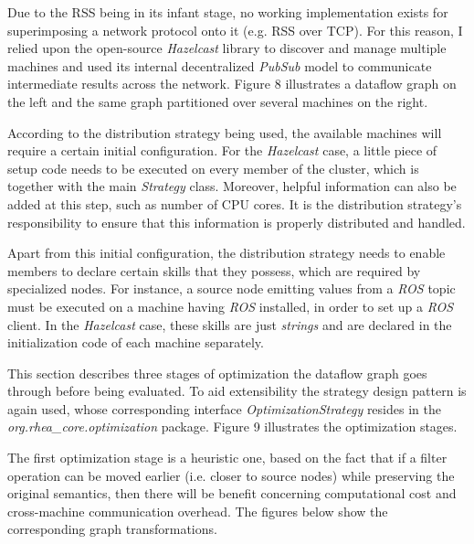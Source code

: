 \documentclass{dithesis}
\begin{document}

Due to the RSS being in its infant stage, no working implementation exists for superimposing a network protocol onto it (e.g. RSS over TCP). For this reason, I relied upon the open-source \textit{Hazelcast} library to discover and manage multiple machines and used its internal decentralized \textit{PubSub} model to communicate intermediate results across the network. Figure 8 illustrates a dataflow graph on the left and the same graph partitioned over several machines on the right.



According to the distribution strategy being used, the available machines will require a certain initial configuration. For the \textit{Hazelcast} case, a little piece of setup code needs to be executed on every member of the cluster, which is together with the main \textit{Strategy} class. Moreover, helpful information can also be added at this step, such as number of CPU cores. It is the distribution strategy's responsibility to ensure that this information is properly distributed and handled.

Apart from this initial configuration, the distribution strategy needs to enable members to declare certain skills that they possess, which are required by specialized nodes. For instance, a source node emitting values from a \textit{ROS} topic must be executed on a machine having \textit{ROS} installed, in order to set up a \textit{ROS} client. In the \textit{Hazelcast} case, these skills are just \textit{strings} and are declared in the initialization code of each machine separately.


This section describes three stages of optimization the dataflow graph goes through before being evaluated. To aid extensibility  the strategy design pattern is again used, whose corresponding interface \textit{OptimizationStrategy} resides in the \textit{org.rhea\_core.optimization} package. Figure 9 illustrates the optimization stages.



The first optimization stage is a heuristic one, based on the fact that if a filter operation can be moved earlier (i.e. closer to source nodes) while preserving the original semantics, then there will be benefit concerning computational cost and cross-machine communication overhead. The figures below show the corresponding graph transformations.
\end{document}
